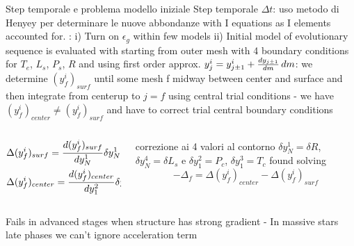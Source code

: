 \begin{frame}{Step temporale e problema modello iniziale}
Step temporale $\Delta t$: uso metodo di Henyey per determinare le nuove abbondanze with I equations as I elements accounted for.
: i) Turn on $\epsilon_g$ within few models ii) Initial model of evolutionary sequence is evaluated with 
starting from outer mesh with 4 boundary conditions for $T_e$, $L_s$, $P_s$, $R$ and using first order approx. $y_j^i=y_{j\pm1}^i+\TDy{m}{y_{j\pm1}}\,dm$: we determine $(y_f^i)_{surf}$ until some mesh f midway between center and surface and then integrate from centerup to $j=f$ using central trial conditions - we have $(y_f^i)_{center}\neq(y_f^i)_{surf}$ and have to correct trial central boundary conditions
\begin{columns}[T]
	\begin{column}{0.5\textwidth}
\begin{align*}
&\Delta(y_f^i)_{surf}=\TDy{y_N^1}{(y^i_f)_{surf}}\delta y_N^1+\TDy{y_N^4}{(y^i_f)_{surf}}\delta y_N^4\\
&\Delta(y_f^i)_{center}=\TDy{y_1^2}{(y^i_f)_{center}}\delta y_1^2+\TDy{y_1^3}{(y^i_f)_{center}}\delta y_1^3
\end{align*}
	\end{column}
	\begin{column}{0.5\textwidth}
correzione ai 4 valori al contorno $\delta y_N^1=\delta R$, $\delta y_N^4=\delta L_s$ e $\delta y_1^2=P_c$, $\delta y_1^3=T_c$ found solving \[-\Delta_f=\Delta(y_f^i)_{center}-\Delta(y_f^i)_{surf}\]
	\end{column}
\end{columns}
Fails in advanced stages when structure has strong gradient - In massive stars late phases we can't ignore acceleration term
\end{frame}
